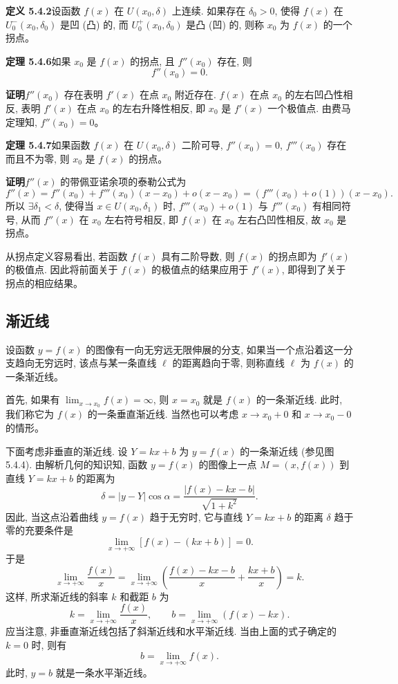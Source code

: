 \documentclass[UTF8,12pt,a4paper,fontset=fandol]{ctexart}
\begin{document}
\noindent\textbf{定义 5.4.2}\quad 设函数 $f(x)$ 在 $U(x_0,\delta)$ 上连续. 如果存在 $\delta_0>0$, 使得 $f(x)$ 在 $U_0^-(x_0,\delta_0)$ 是凹 (凸) 的, 而 $U_0^+(x_0,\delta_0)$ 是凸 (凹) 的, 则称 $x_0$ 为 $f(x)$ 的一个拐点。

\noindent\textbf{定理 5.4.6}\quad 如果 $x_0$ 是 $f(x)$ 的拐点, 且 $f''(x_0)$ 存在, 则
\[
  f''(x_0)=0.
\]

\noindent\textbf{证明}\quad $f''(x_0)$ 存在表明 $f'(x)$ 在点 $x_0$ 附近存在. $f(x)$ 在点 $x_0$ 的左右凹凸性相反, 表明 $f'(x)$ 在点 $x_0$ 的左右升降性相反, 即 $x_0$ 是 $f'(x)$ 一个极值点. 由费马定理知, $f''(x_0)=0$。

\noindent\textbf{定理 5.4.7}\quad 如果函数 $f(x)$ 在 $U(x_0,\delta)$ 二阶可导, $f''(x_0)=0$, $f'''(x_0)$ 存在而且不为零, 则 $x_0$ 是 $f(x)$ 的拐点。

\noindent\textbf{证明}\quad $f''(x)$ 的带佩亚诺余项的泰勒公式为
\[
  f''(x)=f''(x_0)+f'''(x_0)(x-x_0)+o(x-x_0)
  =(f'''(x_0)+o(1))(x-x_0).
\]
所以 $\exists\delta_1<\delta$, 使得当 $x\in U(x_0,\delta_1)$ 时, $f'''(x_0)+o(1)$ 与 $f'''(x_0)$ 有相同符号, 从而 $f''(x)$ 在 $x_0$ 左右符号相反, 即 $f(x)$ 在 $x_0$ 左右凸凹性相反, 故 $x_0$ 是拐点。

从拐点定义容易看出, 若函数 $f(x)$ 具有二阶导数, 则 $f(x)$ 的拐点即为 $f'(x)$ 的极值点. 因此将前面关于 $f(x)$ 的极值点的结果应用于 $f'(x)$, 即得到了关于拐点的相应结果。

\subsection{渐近线}

设函数 $y=f(x)$ 的图像有一向无穷远无限伸展的分支, 如果当一个点沿着这一分支趋向无穷远时, 该点与某一条直线 $\ell$ 的距离趋向于零, 则称直线 $\ell$ 为 $f(x)$ 的一条渐近线。

首先, 如果有 $\lim_{x\to x_0}f(x)=\infty$, 则 $x=x_0$ 就是 $f(x)$ 的一条渐近线. 此时, 我们称它为 $f(x)$ 的一条垂直渐近线. 当然也可以考虑 $x\to x_0+0$ 和 $x\to x_0-0$ 的情形。

下面考虑非垂直的渐近线. 设 $Y=kx+b$ 为 $y=f(x)$ 的一条渐近线 (参见图 5.4.4). 由解析几何的知识知, 函数 $y=f(x)$ 的图像上一点 $M=(x,f(x))$ 到直线 $Y=kx+b$ 的距离为
\[
  \delta=|y-Y|\cos\alpha=\frac{|f(x)-kx-b|}{\sqrt{1+k^2}}.
\]
因此, 当这点沿着曲线 $y=f(x)$ 趋于无穷时, 它与直线 $Y=kx+b$ 的距离 $\delta$ 趋于零的充要条件是
\[
  \lim_{x\to+\infty}[f(x)-(kx+b)]=0.
\]
于是
\[
  \lim_{x\to+\infty}\frac{f(x)}x
  =\lim_{x\to+\infty}\left(\frac{f(x)-kx-b}{x}+\frac{kx+b}{x}\right)=k.
\]
这样, 所求渐近线的斜率 $k$ 和截距 $b$ 为
\[
  k=\lim_{x\to+\infty}\frac{f(x)}x,\qquad
  b=\lim_{x\to+\infty}(f(x)-kx).
\]
应当注意, 非垂直渐近线包括了斜渐近线和水平渐近线. 当由上面的式子确定的 $k=0$ 时, 则有
\[
  b=\lim_{x\to+\infty}f(x).
\]
此时, $y=b$ 就是一条水平渐近线。
\end{document}

